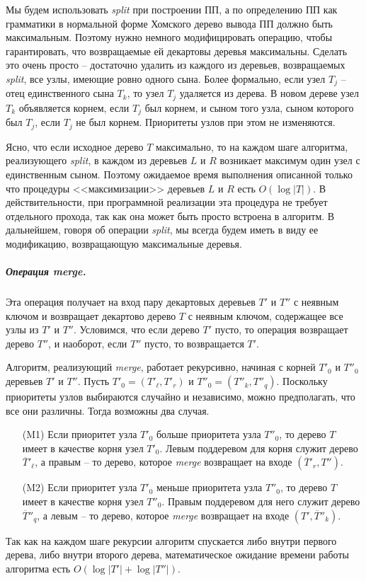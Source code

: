 ﻿\documentclass[11pt]{article}
\theoremstyle{remark}
\begin{document}
\medskip

Мы будем использовать \emph{split} при построении ПП, а по определению ПП как грамматики в нормальной форме Хомского дерево вывода ПП
должно быть максимальным. Поэтому нужно немного модифицировать операцию, чтобы гарантировать, что возвращаемые ей декартовы деревья
максимальны. Сделать это очень просто -- достаточно удалить из каждого из деревьев, возвращаемых \emph{split}, все узлы, имеющие ровно
одного сына. Более формально, если узел $T_j$ -- отец единственного сына $T_k$, то узел $T_j$ удаляется из дерева. В новом дереве узел
$T_k$ объявляется корнем, если $T_j$ был корнем, и сыном того узла, сыном которого был $T_j$, если $T_j$ не был корнем. Приоритеты узлов
при этом не изменяются.

Ясно, что если исходное дерево $T$ максимально, то на каждом шаге алгоритма, реализующего \emph{split}, в каждом из деревьев $L$ и $R$
возникает максимум один узел с единственным сыном. Поэтому ожидаемое время выполнения описанной только что процедуры <<максимизации>>
деревьев $L$ и $R$ есть $O(\log|T|)$. В действительности, при программной реализации эта процедура не требует отдельного прохода, так как
она может быть просто встроена в алгоритм. В дальнейшем, говоря об операции \emph{split}, мы всегда будем иметь в виду ее модификацию,
возвращающую максимальные деревья.

\subparagraph*{Операция \emph{merge}.} Эта операция получает на вход пару декартовых деревьев $T'$ и $T''$ с неявным ключом и возвращает
декартово дерево $T$ с неявным ключом, содержащее все узлы из $T'$ и $T''$. Условимся, что если дерево $T'$ пусто, то операция возвращает
дерево $T''$, и наоборот, если  $T''$ пусто, то возвращается $T'$.

Алгоритм, реализующий \emph{merge}, работает рекурсивно, начиная с корней $T'_0$ и $T''_0$ деревьев $T'$ и $T''$. Пусть $T'_0 = (T'_{\ell},
T'_{r})$ и $T''_0 = (T''_{k}, T''_{q})$. Поскольку приоритеты узлов выбираются случайно и независимо, можно предполагать, что все они
различны. Тогда возможны два случая.
\begin{itemize}
  \item[(M1)] Если приоритет узла $T'_0$ больше приоритета узла $T''_0$, то дерево $T$ имеет в качестве корня узел $T'_0$. Левым поддеревом
  для корня служит дерево $\overline{T}'_{\ell}$, а правым -- то дерево, которое  \emph{merge} возвращает на входе
  $(\overline{T}'_{r},T'')$.
  \item[(M2)] Если приоритет узла $T'_0$ меньше приоритета узла $T''_0$, то дерево $T$ имеет в качестве корня узел $T''_0$. Правым поддеревом
  для него служит дерево $\overline{T}''_{q}$, а левым -- то дерево, которое  \emph{merge} возвращает на входе
  $(T',\overline{T}''_k)$.
\end{itemize}
Так как на каждом шаге рекурсии алгоритм спускается либо внутри первого дерева, либо внутри второго дерева, математическое ожидание времени
работы алгоритма есть $O(\log|T'| + \log |T''|)$.
\end{document}
